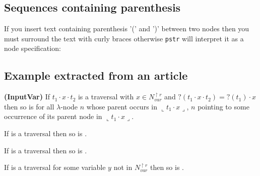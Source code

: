 \subsection{Sequences containing parenthesis}
If you insert text containing parenthesis '(' and ')' between two nodes then you must surround
the text with curly braces otherwise \verb|pstr| will interpret it as a node specification:
\begin{codeexample}[width=7.1cm]
\end{codeexample}

\subsection{Example extracted from an article}
\newcommand{\oview}[1]{\llcorner #1 \lrcorner}
{\bf (InputVar)} If $t_1 \cdot x \cdot t_2$ is a traversal with
  $x \in N_{var}^{\upharpoonright r}$ and $?(t_1 \cdot x \cdot
  t_2)=?(t_1) \cdot x$ then so is  for all
  $\lambda$-node $n$ whose parent occurs in $\oview{t_1 \cdot x}$, $n$
  pointing to some occurrence of its parent node in $\oview{t_1 \cdot x}$.

  If  is a traversal then so is
.

 If 
is a traversal then so is .

If  is a traversal
for some variable $y$ not in $N_{var}^{\upharpoonright r}$ then so
is .

